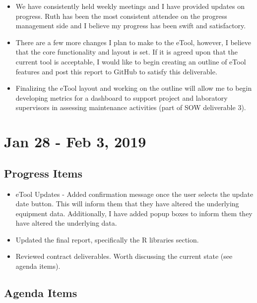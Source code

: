 \documentclass[]{article}
\providecommand{\tightlist}{%
  \setlength{\itemsep}{0pt}\setlength{\parskip}{0pt}}
\begin{document}
\begin{enumerate}
  \begin{itemize}
  \tightlist
  \item
    We have consistently held weekly meetings and I have provided
    updates on progress. Ruth has been the most consistent attendee on
    the progress management side and I believe my progress has been
    swift and satisfactory.
  \item
    There are a few more changes I plan to make to the eTool, however, I
    believe that the core functionality and layout is set. If it is
    agreed upon that the current tool is acceptable, I would like to
    begin creating an outline of eTool features and post this report to
    GitHub to satisfy this deliverable.
  \item
    Finalizing the eTool layout and working on the outline will allow me
    to begin developing metrics for a dashboard to support project and
    laboratory supervisors in assessing maintenance activities (part of
    SOW deliverable 3).
  \end{itemize}
\end{enumerate}

\hypertarget{jan-28---feb-3-2019}{%
\section{Jan 28 - Feb 3, 2019}\label{jan-28---feb-3-2019}}

\hypertarget{progress-items-8}{%
\subsection{Progress Items}\label{progress-items-8}}

\begin{itemize}
\tightlist
\item
  eTool Updates - Added confirmation message once the user selects the
  update date button. This will inform them that they have altered the
  underlying equipment data. Additionally, I have added popup boxes to
  inform them they have altered the underlying data.
\item
  Updated the final report, specifically the R libraries section.
\item
  Reviewed contract deliverables. Worth discussing the current state
  (see agenda items).
\end{itemize}

\hypertarget{agenda-items-8}{%
\subsection{Agenda Items}\label{agenda-items-8}}
\end{document}
